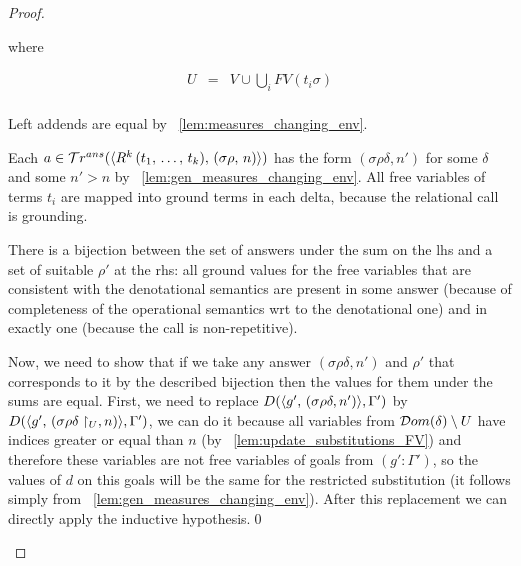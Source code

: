 \begin{proof}
\begin{enumerate}
\begin{enumerate}
    where
    
    \[ \begin{array}{lcl}
    U & = &  V \cup \bigcup_{i} FV(t_i \sigma) \\
    \end{array} \]
    
    Left addends are equal by \lemmaword~\ref{lem:measures_changing_env}.
    
    Each $a \in \mathcal{T}r^{ans}(\langle R^k\,(t_1, \, \dots, \, t_k) ,\, (\sigma\rho ,\, n) \rangle)$ has the form $(\sigma \rho \delta, n')$ for some $\delta$ and some $n' > n$ by \lemmaword~\ref{lem:gen_measures_changing_env}. All free variables of terms $t_i$ are mapped into ground terms in each delta, because the relational call is grounding.
    
    There is a bijection between the set of answers under the sum on the lhs and a set of suitable $\rho'$ at the rhs: all ground values for the free variables that are consistent with the denotational semantics are present in some answer (because of completeness of the operational semantics wrt to the denotational one) and in exactly one (because the call is non-repetitive).
    
    Now, we need to show that if we take any answer $(\sigma \rho \delta, n')$ and $\rho'$ that corresponds to it by the described bijection then the values for them under the sums are equal. First, we need to replace $D(\langle g' ,\, (\sigma \rho \delta, n') \rangle, \Gamma')$ by $D(\langle g' ,\, (\sigma \rho \delta\restriction_U, n) \rangle, \Gamma')$, we can do it because all variables from $\mathcal{D}om(\delta) \setminus U$ have indices greater or equal than $n$ (by \lemmaword~\ref{lem:update_substitutions_FV}) and therefore these variables are not free variables of goals from $(g' : \Gamma')$, so the values of $d$ on this goals will be the same for the restricted substitution (it follows simply from \lemmaword~\ref{lem:gen_measures_changing_env}). After this replacement we can directly apply the inductive hypothesis.\qed
	
	\end{enumerate}


\end{enumerate}
\end{proof}

